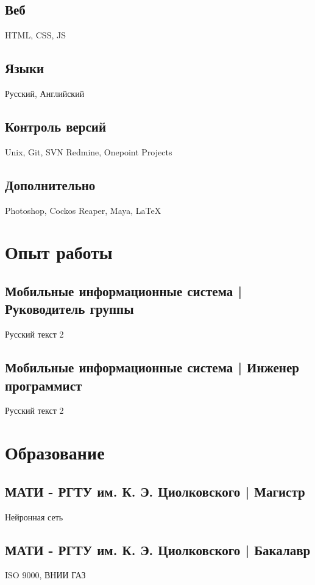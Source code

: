 \documentclass[a4paper]{curricula-vitae}
\begin{document}
\begin{minipage}[t]{0.33\textwidth}
\subsection{Веб}
HTML, CSS, JS

\subsection{Языки}
Русский, Английский

\subsection{Контроль версий}
Unix, Git, SVN
Redmine, Onepoint Projects

\subsection{Дополнительно}
Photoshop, 
Cockos Reaper, 
Maya, \LaTeX

\end{minipage} %
\hfill
\begin{minipage}[t]{0.66\textwidth} %

\section{Опыт работы} 

\subsection{Мобильные информационные система | Руководитель группы}
Русский текст 2

\subsection{Мобильные информационные система | Инженер программист}
Русский текст 2

\section{Образование} 

\subsection{МАТИ - РГТУ им. К. Э. Циолковского | Магистр}
Нейронная сеть

\subsection{МАТИ - РГТУ им. К. Э. Циолковского | Бакалавр}
ISO 9000, ВНИИ ГАЗ

\end{minipage} %

\end{document}
